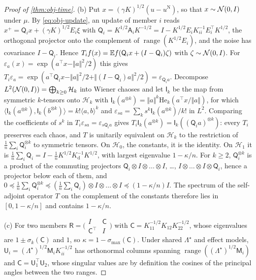 \begin{proof}[Proof of \cref{thm:obj-time}]
(b) Put $x=(\gamma K)^{1/2}(u-u^{\mathrm N})$, so that $x\sim\mathcal{N}(0,I)$ under $\mu$. By \eqref{eq:obj-update}, an update of member $i$ reads $x^+=\mathsf Q_ix+(\gamma K)^{1/2}E_i\xi$ with $\mathsf Q_i=K^{1/2}\mathsf A_iK^{-1/2}=I-K^{1/2}E_iK_{ii}^{-1}E_i^\top K^{1/2}$, the orthogonal projector onto the complement of $\operatorname{range}(K^{1/2}E_i)$, and the noise has covariance $I-\mathsf Q_i$. Hence $T_if(x)=\mathbb{E} f(\mathsf Q_ix+(I-\mathsf Q_i)\zeta)$ with $\zeta\sim\mathcal{N}(0,I)$. For $\varepsilon_a(x)=\exp(a^\top x-\Vert a\Vert^2/2)$ this gives $T_i\varepsilon_a=\exp(a^\top\mathsf Q_ix-\Vert a\Vert^2/2+\Vert(I-\mathsf Q_i)a\Vert^2/2)=\varepsilon_{\mathsf Q_ia}$. Decompose $L^2(\mathcal{N}(0,I))=\bigoplus_{k\ge0}\mathcal H_k$ into Wiener chaoses and let $\mathsf I_k$ be the map from symmetric $k$-tensors onto $\mathcal H_k$ with $\mathsf I_k(a^{\otimes k})=\Vert a\Vert^k\mathrm{He}_k(a^\top x/\Vert a\Vert)$, for which $\langle\mathsf I_k(a^{\otimes k}),\mathsf I_k(b^{\otimes k})\rangle=k!\langle a,b\rangle^k$ and $\varepsilon_{sa}=\sum_ks^k\mathsf I_k(a^{\otimes k})/k!$ in $L^2$. Comparing the coefficients of $s^k$ in $T_i\varepsilon_{sa}=\varepsilon_{s\mathsf Q_ia}$ gives $T_i\mathsf I_k(a^{\otimes k})=\mathsf I_k((\mathsf Q_ia)^{\otimes k})$: every $T_i$ preserves each chaos, and $T$ is unitarily equivalent on $\mathcal H_k$ to the restriction of $\frac1n\sum_i\mathsf Q_i^{\otimes k}$ to symmetric tensors. On $\mathcal H_0$, the constants, it is the identity. On $\mathcal H_1$ it is $\frac1n\sum_i\mathsf Q_i=I-\frac1nK^{1/2}K_{\mathrm d}^{-1}K^{1/2}$, with largest eigenvalue $1-\kappa/n$. For $k\ge2$, $\mathsf Q_i^{\otimes k}$ is a product of the commuting projectors $\mathsf Q_i\otimes I\otimes\dots\otimes I$, \dots, $I\otimes\dots\otimes I\otimes\mathsf Q_i$, hence a projector below each of them, and $0\preceq\frac1n\sum_i\mathsf Q_i^{\otimes k}\preceq(\frac1n\sum_i\mathsf Q_i)\otimes I\otimes\dots\otimes I\preceq(1-\kappa/n)I$. The spectrum of the self-adjoint operator $T$ on the complement of the constants therefore lies in $[0,1-\kappa/n]$ and contains $1-\kappa/n$.

(c) For two members $\mathsf R=\bigl(\begin{smallmatrix}I&\mathsf C\\\mathsf C^\top&I\end{smallmatrix}\bigr)$ with $\mathsf C=K_{11}^{-1/2}K_{12}K_{22}^{-1/2}$, whose eigenvalues are $1\pm\sigma_k(\mathsf C)$ and $1$, so $\kappa=1-\sigma_{\max}(\mathsf C)$. Under shared $\Lambda^\star$ and effect models, $\mathsf U_i=(\Lambda^\star)^{1/2}\mathsf M_iK_{ii}^{-1/2}$ has orthonormal columns spanning $\operatorname{range}((\Lambda^\star)^{1/2}\mathsf M_i)$ and $\mathsf C=\mathsf U_1^\top\mathsf U_2$, whose singular values are by definition the cosines of the principal angles between the two ranges.


\end{proof}
